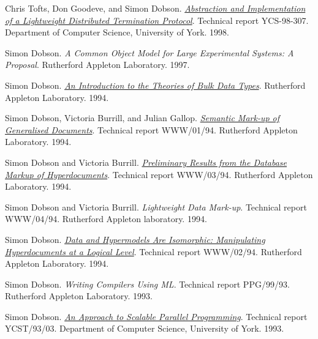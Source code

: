 \documentclass[11pt]{article}
\begin{document}
\label{org4ee8693}Chris Tofts, Don Goodeve, and Simon Dobson.  \emph{\href{https://simondobson.org/softcopy/YCS-98-307.pdf}{Abstraction and Implementation of a Lightweight Distributed Termination Protocol}}. Technical report YCS-98-307. Department of Computer Science, University of York. 1998.

\label{orgef2e381}Simon Dobson.  \emph{A Common Object Model for Large Experimental Systems: A Proposal}. Rutherford Appleton Laboratory. 1997.

\label{orgd5a438b}Simon Dobson.  \emph{\href{https://simondobson.org/softcopy/bulk-data-types.pdf}{An Introduction to the Theories of Bulk Data Types}}. Rutherford Appleton Laboratory. 1994.

\label{org73989e9}Simon Dobson, Victoria Burrill, and Julian Gallop.  \emph{\href{https://simondobson.org/softcopy/semantic-markup-94.pdf}{Semantic Mark-up of Generalised Documents}}. Technical report WWW/01/94. Rutherford Appleton Laboratory. 1994.

\label{orge96e074}Simon Dobson and Victoria Burrill.  \emph{\href{https://simondobson.org/softcopy/preliminary-markup-94.pdf}{Preliminary Results from the Database Markup of Hyperdocuments}}. Technical report WWW/03/94. Rutherford Appleton Laboratory. 1994.

\label{orgab78230}Simon Dobson and Victoria Burrill.  \emph{Lightweight Data Mark-up}. Technical report WWW/04/94. Rutherford Appleton laboratory. 1994.

\label{org1dd3938}Simon Dobson.  \emph{\href{https://simondobson.org/softcopy/hyper-94.pdf}{Data and Hypermodels Are Isomorphic: Manipulating Hyperdocuments at a Logical Level}}. Technical report WWW/02/94. Rutherford Appleton Laboratory. 1994.

\label{orgbab3251}Simon Dobson.  \emph{Writing Compilers Using ML}. Technical report PPG/99/93. Rutherford Appleton Laboratory. 1993.

\label{org85440dd}Simon Dobson.  \emph{\href{https://simondobson.org/softcopy/thesis-final.pdf}{An Approach to Scalable Parallel Programming}}. Technical report YCST/93/03. Department of Computer Science, University of York. 1993.
\end{document}

